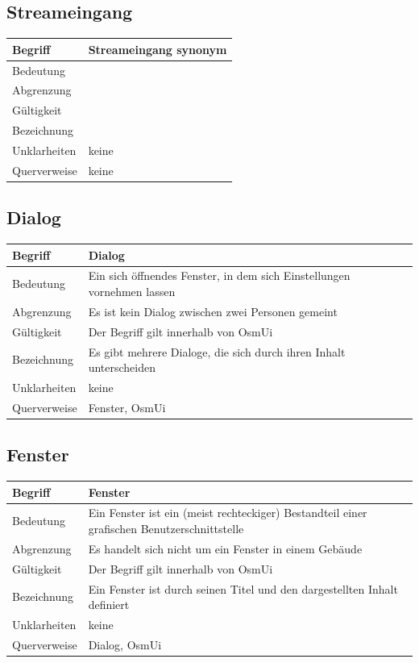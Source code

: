 \documentclass[a4paper,12pt]{scrartcl}
\begin{document}
\begin{center}
\subsection{Streameingang}
\begin{tabular}{|p{5cm}|p{10cm}|}
\hline Begriff & \textbf{Streameingang} synonym \\ 
\hline Bedeutung & \\
\hline Abgrenzung & \\ 
\hline Gültigkeit & \\ 
\hline Bezeichnung & \\ 
\hline Unklarheiten & keine \\ 
\hline Querverweise & keine \\ 
\hline 
\end{tabular}
\subsection{Dialog}
\begin{tabular}{|p{5cm}|p{10cm}|}
\hline Begriff & \textbf{Dialog}\\ 
\hline Bedeutung & Ein sich öffnendes Fenster, in dem sich Einstellungen vornehmen lassen \\ 
\hline Abgrenzung & Es ist kein Dialog zwischen zwei Personen gemeint\\ 
\hline Gültigkeit & Der Begriff gilt innerhalb von OsmUi \\ 
\hline Bezeichnung & Es gibt mehrere Dialoge, die sich durch ihren Inhalt unterscheiden \\ 
\hline Unklarheiten & keine \\ 
\hline Querverweise & Fenster, OsmUi \\ 
\hline
\end{tabular}
\subsection{Fenster}
\begin{tabular}{|p{5cm}|p{10cm}|}
\hline Begriff & \textbf{Fenster}\\ 
\hline Bedeutung & Ein Fenster ist ein (meist rechteckiger) Bestandteil einer grafischen Benutzerschnittstelle \\ 
\hline Abgrenzung & Es handelt sich nicht um ein Fenster in einem Gebäude\\ 
\hline Gültigkeit & Der Begriff gilt innerhalb von OsmUi\\ 
\hline Bezeichnung & Ein Fenster ist durch seinen Titel und den dargestellten Inhalt definiert \\ 
\hline Unklarheiten & keine \\ 
\hline Querverweise & Dialog, OsmUi \\ 
\hline
\end{tabular}

\end{center}
\end{document}

